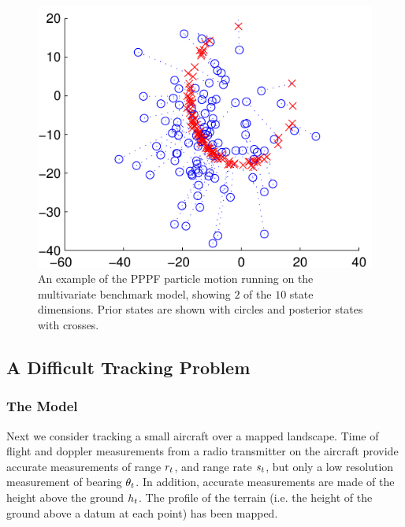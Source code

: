 \documentclass{article}
\begin{document}
\begin{figure}
\centering
\includegraphics[width=0.7\columnwidth]{nlng_example_frame_deter.pdf}
\caption{An example of the PPPF particle motion running on the multivariate benchmark model, showing $2$ of the $10$ state dimensions. Prior states are shown with circles and posterior states with crosses.}
\label{fig:nlng_example_frame}
\end{figure}



\subsection{A Difficult Tracking Problem} \label{sec:numsim:tracking}

\subsubsection{The Model}

Next we consider tracking a small aircraft over a mapped landscape. Time of flight and doppler measurements from a radio transmitter on the aircraft provide accurate measurements of range $r_{t}$, and range rate $s_{t}$, but only a low resolution measurement of bearing $\theta_{t}$. In addition, accurate measurements are made of the height above the ground $h_{t}$. The profile of the terrain (i.e. the height of the ground above a datum at each point) has been mapped.
\end{document}
